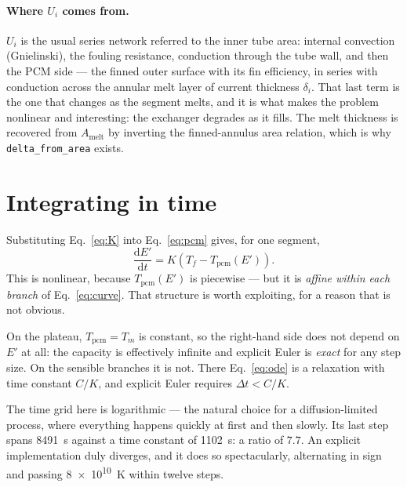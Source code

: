 \documentclass[11pt,a4paper]{article}
\newcommand{\Ui}{\ensuremath{U_{i}}}
\newcommand{\Tm}{\ensuremath{T_{m}}}
\newcommand{\Tpcm}{\ensuremath{T_{\mathrm{pcm}}}}
\newcommand{\Amelt}{\ensuremath{A_{\mathrm{melt}}}}
\newcommand{\code}[1]{\texttt{\small #1}}
\begin{document}
\paragraph{Where $\Ui$ comes from.}
$\Ui$ is the usual series network referred to the inner tube area: internal
convection (Gnielinski), the fouling resistance, conduction through the tube
wall, and then the PCM side --- the finned outer surface with its fin
efficiency, in series with conduction across the annular melt layer of current
thickness $\delta_i$. That last term is the one that changes as the segment
melts, and it is what makes the problem nonlinear and interesting: the
exchanger degrades as it fills. The melt thickness is recovered from $\Amelt$
by inverting the finned-annulus area relation, which is why \code{delta\_from\_area}
exists.

\section{Integrating in time}
\label{sec:integration}

Substituting Eq.~\eqref{eq:K} into Eq.~\eqref{eq:pcm} gives, for one segment,
\begin{equation}
  \frac{\mathrm{d}E'}{\mathrm{d}t} = K\left(T_f - \Tpcm(E')\right).
  \label{eq:ode}
\end{equation}
This is nonlinear, because $\Tpcm(E')$ is piecewise --- but it is \emph{affine
within each branch} of Eq.~\eqref{eq:curve}. That structure is worth
exploiting, for a reason that is not obvious.

On the plateau, $\Tpcm=\Tm$ is constant, so the right-hand side does not depend
on $E'$ at all: the capacity is effectively infinite and explicit Euler is
\emph{exact} for any step size. On the sensible branches it is not. There
Eq.~\eqref{eq:ode} is a relaxation with time constant $C/K$, and explicit Euler
requires $\Delta t < C/K$.

The time grid here is logarithmic --- the natural choice for a diffusion-limited
process, where everything happens quickly at first and then slowly. Its last
step spans \SI{8491}{\second} against a time constant of
\SI{1102}{\second}: a ratio of $7.7$. An explicit implementation duly diverges,
and it does so spectacularly, alternating in sign and passing
\SI{8e10}{\kelvin} within twelve steps.
\end{document}
